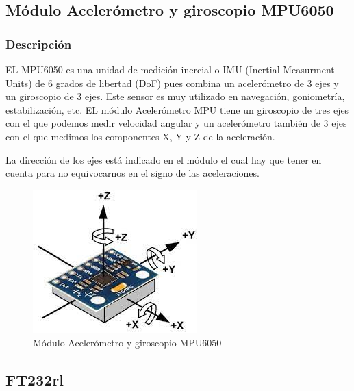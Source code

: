\documentclass[12pt,oneside,spanish]{article}
\begin{document}
\subsection{Módulo Acelerómetro y giroscopio MPU6050}
\subsubsection{Descripción}
EL MPU6050 es una unidad de medición inercial o IMU (Inertial Measurment Units) de 6 grados de libertad (DoF) pues combina un acelerómetro de 3 ejes y un giroscopio de 3 ejes. Este sensor es muy utilizado en navegación, goniometría, estabilización, etc.
EL módulo Acelerómetro MPU tiene un giroscopio de tres ejes con el que podemos medir velocidad angular y un acelerómetro también de 3 ejes con el que medimos los componentes X, Y y Z de la aceleración.

La dirección de los ejes está indicado en el módulo el cual hay que tener en cuenta para no equivocarnos en el signo de las aceleraciones.
\begin{figure}[H]
    \centering
    \includegraphics{STM32CubeIDE/giros.jpg}
    \caption{Módulo Acelerómetro y giroscopio MPU6050}
    \label{fig:my_label}
\end{figure}
\item 
\subsection{FT232rl}
\end{document}
